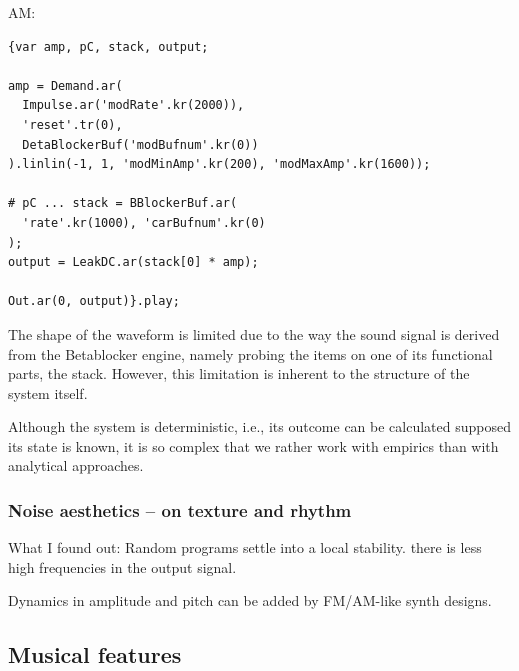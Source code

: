 \documentclass[letterpaper, 12pt]{article}
\begin{document}
AM:
\begin{Verbatim}[fontfamily=courier, xleftmargin=\parindent]
{var amp, pC, stack, output;

amp = Demand.ar(
  Impulse.ar('modRate'.kr(2000)), 
  'reset'.tr(0),
  DetaBlockerBuf('modBufnum'.kr(0))
).linlin(-1, 1, 'modMinAmp'.kr(200), 'modMaxAmp'.kr(1600));

# pC ... stack = BBlockerBuf.ar(
  'rate'.kr(1000), 'carBufnum'.kr(0)
);
output = LeakDC.ar(stack[0] * amp);

Out.ar(0, output)}.play;
\end{Verbatim}





The shape of the waveform is limited due to the way the sound signal is derived from the Betablocker engine, namely probing the items on one of its functional parts, the stack. 
However, this limitation is inherent to the structure of the system itself.

Although the system is deterministic, i.e., its outcome can be calculated supposed its state is known, it is so complex that we rather work with empirics than with analytical approaches.

\subsubsection{Noise aesthetics -- on texture and rhythm} 
\label{sub:noise_aesthetics}


What I found out: Random programs settle into a local stability. there is less high frequencies in the output signal. 

Dynamics in amplitude and pitch can be added by FM/AM-like synth designs.



\subsection{Musical features} 
\label{sub:musical_features}
\end{document}
